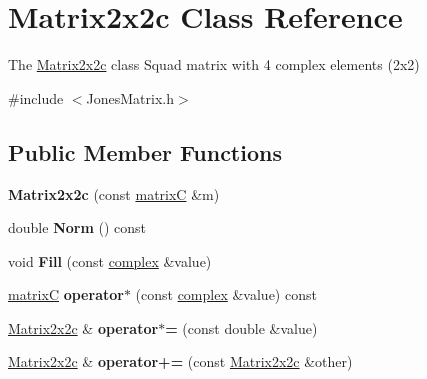 \hypertarget{class_matrix2x2c}{}\section{Matrix2x2c Class Reference}
\label{class_matrix2x2c}


The \mbox{\hyperlink{class_matrix2x2c}{Matrix2x2c}} class Squad matrix with 4 complex elements (2x2)  




{\ttfamily \#include $<$Jones\+Matrix.\+h$>$}

\subsection*{Public Member Functions}
\begin{DoxyCompactItemize}
\item 
\mbox{\label{class_matrix2x2c_a45a07c0462511e7ff00dab1a0246954d}} 
{\bfseries Matrix2x2c} (const \mbox{\hyperlink{classmatrix_c}{matrixC}} \&m)
\item 
\mbox{\label{class_matrix2x2c_a08a3e514022273afbb9602d97859d5e1}} 
double {\bfseries Norm} () const
\item 
\mbox{\label{class_matrix2x2c_a695ab24fce73ea8731478bff19350de2}} 
void {\bfseries Fill} (const \mbox{\hyperlink{classcomplex}{complex}} \&value)
\item 
\mbox{\label{class_matrix2x2c_a980963d20e47533c17ffcd714d19681c}} 
\mbox{\hyperlink{classmatrix_c}{matrixC}} {\bfseries operator$\ast$} (const \mbox{\hyperlink{classcomplex}{complex}} \&value) const
\item 
\mbox{\label{class_matrix2x2c_a72183df24e5d34ff97e91fa879cdbd1b}} 
\mbox{\hyperlink{class_matrix2x2c}{Matrix2x2c}} \& {\bfseries operator$\ast$=} (const double \&value)
\item 
\mbox{\label{class_matrix2x2c_a70b6828f6137a2a1ac6dd07a074f717e}} 
\mbox{\hyperlink{class_matrix2x2c}{Matrix2x2c}} \& {\bfseries operator+=} (const \mbox{\hyperlink{class_matrix2x2c}{Matrix2x2c}} \&other)
\end{DoxyCompactItemize}
